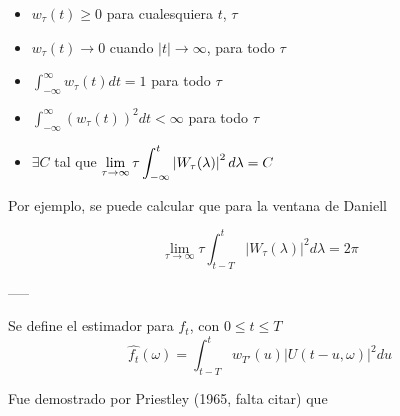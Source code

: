 \begin{itemize}
\item $w_{\tau}(t) \geq 0$ para cualesquiera $t$, $\tau$
\item $w_{\tau}(t) \rightarrow 0$ cuando $\lvert t \lvert \rightarrow \infty$, para todo $\tau$
\item $\displaystyle \int_{-\infty}^{\infty} w_{\tau}(t) dt = 1$ para todo $\tau$
\item $\displaystyle \int_{-\infty}^{\infty} \left( w_{\tau}(t) \right)^{2} dt < \infty$ para todo $\tau$
\item $\exists C$ tal que  
$\displaystyle \lim_{\tau\rightarrow\infty} \tau \int_{-\infty}^{t} \left|  W_{\tau}(\lambda)  \right|^{2} d\lambda = C$
\end{itemize}


%

Por ejemplo, se puede calcular que para la ventana de Daniell

$$\lim_{\tau\rightarrow\infty} \tau \int_{t-T}^{t} \lvert W_{\tau}(\lambda) \lvert^{2} d\lambda = 2\pi$$

-----

Se define el estimador para $f_t$, con $0 \leq t \leq T$
\begin{equation*}
\widehat{f_t}(\omega) = \int_{t-T}^{t} w_{T'}(u) \lvert U(t-u,\omega) \lvert^{2} du
\end{equation*}

Fue demostrado por Priestley (1965, falta citar) que 

